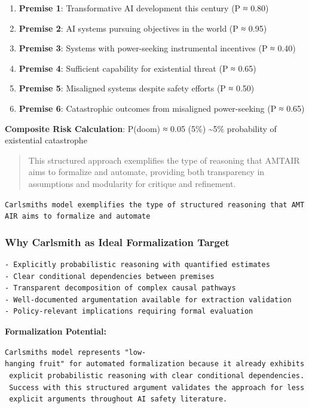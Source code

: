 \documentclass[
  11pt,
  letterpaper,
]{book}
\providecommand{\tightlist}{%
  \setlength{\itemsep}{0pt}\setlength{\parskip}{0pt}}
\begin{document}
\begin{enumerate}
\def\labelenumi{\arabic{enumi}.}
\tightlist
\item
  \textbf{Premise 1}: Transformative AI development this century (P ≈
  0.80)
\item
  \textbf{Premise 2}: AI systems pursuing objectives in the world (P ≈
  0.95)
\item
  \textbf{Premise 3}: Systems with power-seeking instrumental incentives
  (P ≈ 0.40)
\item
  \textbf{Premise 4}: Sufficient capability for existential threat (P ≈
  0.65)
\item
  \textbf{Premise 5}: Misaligned systems despite safety efforts (P ≈
  0.50)
\item
  \textbf{Premise 6}: Catastrophic outcomes from misaligned
  power-seeking (P ≈ 0.65)
\end{enumerate}

\textbf{Composite Risk Calculation}: P(doom) ≈ 0.05 (5\%)
\textasciitilde5\% probability of existential catastrophe

\begin{quote}
This structured approach exemplifies the type of reasoning that AMTAIR
aims to formalize and automate, providing both transparency in
assumptions and modularity for critique and refinement.
\end{quote}

\texttt{Carlsmith\textquotesingle{}s\ model\ exemplifies\ the\ type\ of\ structured\ reasoning\ that\ AMTAIR\ aims\ to\ formalize\ and\ automate}

\subsubsection{Why Carlsmith as Ideal Formalization
Target}\label{sec-carlsmith-ideal}

\begin{verbatim}
- Explicitly probabilistic reasoning with quantified estimates
- Clear conditional dependencies between premises  
- Transparent decomposition of complex causal pathways
- Well-documented argumentation available for extraction validation
- Policy-relevant implications requiring formal evaluation
\end{verbatim}

\textbf{Formalization Potential:}

\texttt{Carlsmith\textquotesingle{}s\ model\ represents\ "low-hanging\ fruit"\ for\ automated\ formalization\ because\ it\ already\ exhibits\ explicit\ probabilistic\ reasoning\ with\ clear\ conditional\ dependencies.\ Success\ with\ this\ structured\ argument\ validates\ the\ approach\ for\ less\ explicit\ arguments\ throughout\ AI\ safety\ literature.}
\end{document}
